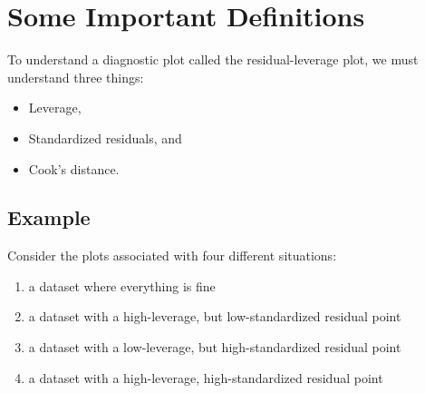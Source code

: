 \documentclass[residuals.tex]{subfiles}
\begin{document}
\newpage
\Large
\section{Some Important Definitions}

To understand a diagnostic plot called the residual-leverage plot, we must understand three things:

\begin{itemize}
	\item Leverage,
	\item Standardized residuals, and
	\item Cook's distance.
\end{itemize}





\subsection*{Example}

Consider the plots associated with four different situations:
\begin{enumerate}
	\item a dataset where everything is fine
	\item a dataset with a high-leverage, but low-standardized residual point
	\item a dataset with a low-leverage, but high-standardized residual point
	\item a dataset with a high-leverage, high-standardized residual point
\end{enumerate}
\end{document}
